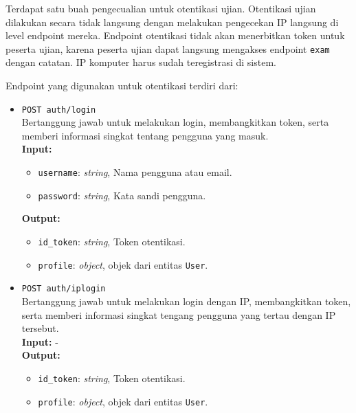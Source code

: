     Terdapat satu buah pengecualian untuk otentikasi ujian. Otentikasi ujian
    dilakukan secara tidak langsung dengan melakukan pengecekan IP langsung di
    level endpoint mereka. Endpoint otentikasi tidak akan menerbitkan token
    untuk peserta ujian, karena peserta ujian dapat langsung mengakses endpoint
    \texttt{exam} dengan catatan. IP komputer harus sudah teregistrasi di
    sistem.
    
    Endpoint yang digunakan untuk otentikasi terdiri dari:
    \begin{itemize}
        \item \texttt{POST auth/login} \\
            Bertanggung jawab untuk melakukan login, membangkitkan token, serta
            memberi informasi singkat tentang pengguna yang masuk.\\
            \textbf{Input:}
            \begin{itemize}
                \item \texttt{username}: \textit{string}, Nama pengguna atau
                    email.
                \item \texttt{password}: \textit{string}, Kata sandi pengguna.
            \end{itemize}
            \textbf{Output:}
            \begin{itemize}
                \item \texttt{id\_token}: \textit{string}, Token otentikasi.
                \item \texttt{profile}: \textit{object}, objek dari entitas
                    \texttt{User}.
            \end{itemize}
        
        \item \texttt{POST auth/iplogin} \\
            Bertanggung jawab untuk melakukan login dengan IP, membangkitkan
            token, serta memberi informasi singkat tengang pengguna yang tertau
            dengan IP tersebut. \\
            \textbf{Input:} -\\
            \textbf{Output:}
            \begin{itemize}
                \item \texttt{id\_token}: \textit{string}, Token otentikasi.
                \item \texttt{profile}: \textit{object}, objek dari entitas
                    \texttt{User}.
            \end{itemize}
            

\end{itemize}
